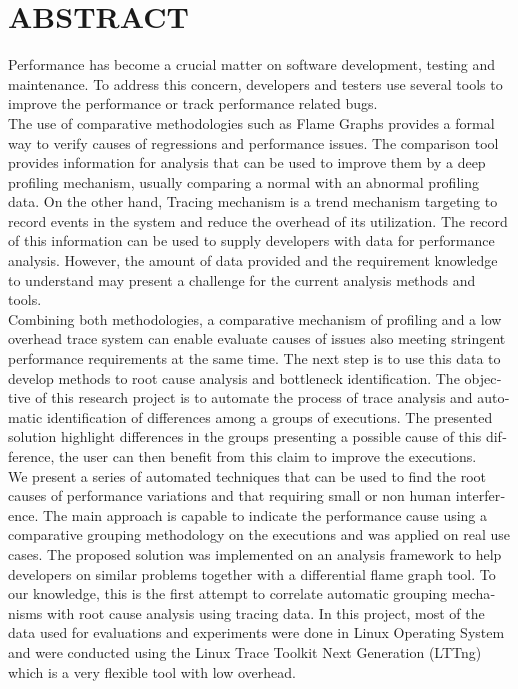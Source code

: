 %

\chapter*{ABSTRACT}\thispagestyle{headings}
%
\begin{otherlanguage}{english}

Performance has become a crucial matter on software development, testing and maintenance. To address this concern, developers and testers use several tools to improve the performance or track performance related bugs. \\
The use of comparative methodologies such as Flame Graphs provides a formal way to verify causes of regressions and performance issues. The comparison tool provides information for analysis that can be used to improve them by a deep profiling mechanism, usually comparing a normal with an abnormal profiling data.
On the other hand, Tracing mechanism is a trend mechanism targeting to record events in the system and reduce the overhead of its utilization. The record of this information can be used to supply developers with data for performance analysis. However, the amount of data provided and the requirement knowledge to understand may present a challenge for the current analysis methods and tools.\\
Combining both methodologies, a comparative mechanism of profiling and a low overhead trace system can enable evaluate causes of issues also meeting stringent performance requirements at the same time. The next step is to use this data to develop methods to root cause analysis and bottleneck identification.
The objective of this research project is to automate the process of trace analysis and automatic identification of differences among a groups of executions. The presented solution highlight differences in the groups presenting a possible cause of this difference, the user can then benefit from this claim to improve the executions. \\
We present a series of automated techniques that can be used to find the root causes of performance variations and that requiring small or non human interference. The main approach is capable to indicate the performance cause using a comparative grouping methodology on the executions and was applied on real use cases. The proposed solution was implemented on an analysis framework to help developers on similar problems together with a differential flame graph tool. 
To our knowledge, this is the first attempt to correlate automatic grouping mechanisms with root cause analysis using tracing data. In this project, most of the data used for evaluations and experiments were done in Linux Operating System and were conducted using the Linux Trace Toolkit Next Generation (LTTng) which is a very flexible tool with low overhead.


\end{otherlanguage}
